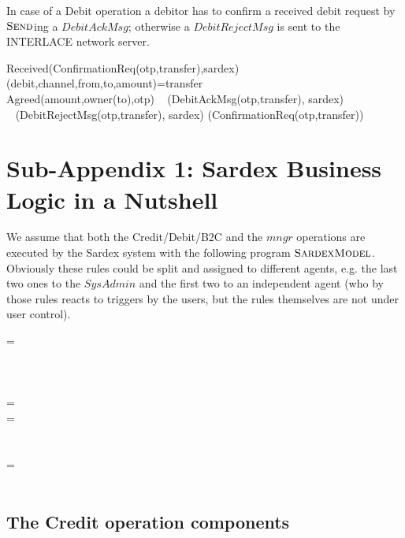 In case of a Debit operation a debitor has to confirm a received debit request by $\hbox{\sc Send}$ing a $DebitAckMsg$; otherwise a $DebitRejectMsg$ is sent to the INTERLACE network server.
\begin{asm}
\IF Received(ConfirmationReq(otp,transfer),\FROM sardex) \THEN \+
\LET (debit,channel,from,to,amount)=transfer \\
\IF Agreed(amount,owner(to),otp)\+
\THEN ~ (DebitAckMsg(otp,transfer), \TO sardex) \\
\ELSE ~ (DebitRejectMsg(otp,transfer), \TO sardex)\-
(ConfirmationReq(otp,transfer))
\end{asm}


\section{Sub-Appendix 1: Sardex Business Logic in a Nutshell}
\label{sect:appendixModel}

We assume that both the Credit/Debit/B2C and the $mngr$ operations are executed by the Sardex system with the following program $\hbox{\sc SardexModel}$. Obviously these rules could be split and assigned to different agents, e.g. the last two ones to the $SysAdmin$ and the first two to an independent agent (who by those rules reacts to triggers by the users, but the rules themselves are not under user control).

\begin{asm}
 =\+
  \\
  \\
  \\
  \\
   \-
\WHERE \+
  =\+
      \\
      \-
  =\+
      \\
      \\
     \\
     \-
   =\+    
     	\\
     	\\
 \end{asm}
 
 \subsection{The Credit operation components}
 
